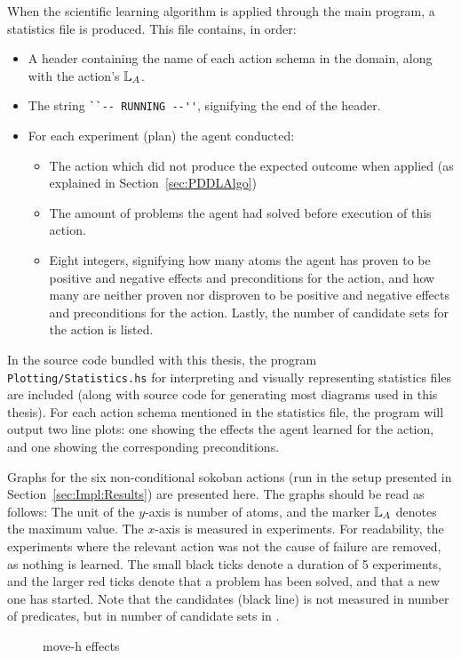 \documentclass[../Master.tex]{subfiles}
\providecommand{\master}{..}
\begin{document}
When the scientific learning algorithm is applied through the main program, a statistics file is produced. This file contains, in order:
\begin{itemize}
    \item A header containing the name of each action schema in the domain, along with the action's $\mathbb{L}_A$.
    \item The string \verb|``-- RUNNING --''|, signifying the end of the header.
    \item For each experiment (plan) the agent conducted:
        \begin{itemize}
            \item The action which did not produce the expected outcome when applied (as explained in Section~\ref{sec:PDDLAlgo})
            \item The amount of problems the agent had solved before execution of this action.
            \item Eight integers, signifying how many  atoms the agent has proven to be positive and negative effects and preconditions for the action, and how many are neither proven nor disproven to be positive and negative effects and preconditions for the action. Lastly, the number of candidate sets for the action is listed.
        \end{itemize}
\end{itemize}

In the source code bundled with this thesis, the program \texttt{Plotting/Statistics.hs} for interpreting and visually representing statistics files are included  (along with source code for generating most diagrams used in this thesis). For each action schema mentioned in the statistics file, the program will output two line plots: one showing the effects the agent learned for the action, and one showing the corresponding preconditions.

Graphs for the six non-conditional sokoban actions (run in the setup presented in Section~\ref{sec:Impl:Results}) are presented here. The graphs should be read as follows:
The unit of the $y$-axis is number of atoms, and the marker $\mathbb{L}_A$ denotes the maximum value. The $x$-axis is measured in experiments. For readability, the experiments where the relevant action was not the cause of failure are removed, as nothing is learned. The small black ticks denote a duration of 5 experiments, and the larger red ticks denote that a problem has been solved, and that a new one has started. Note that the candidates (black line) is not measured in number of predicates, but in number of candidate sets in \Cand.
\begin{figure}
    \centering
    
    \caption{move-h effects}
\end{figure}
\end{document}
